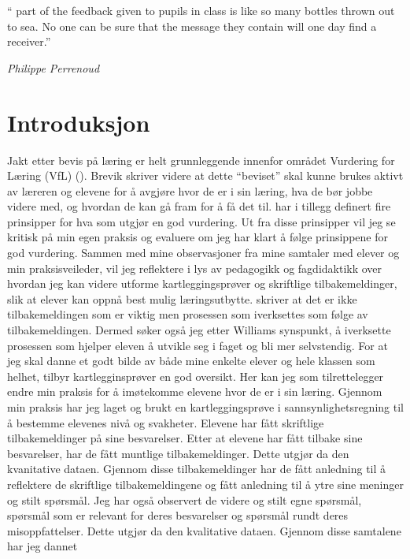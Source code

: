 \documentclass[main.tex]{subfiles}
\begin{document}
\setlength{\epigraphwidth}{0.8\textwidth}
\epigraph{``\textelp{} part of the feedback given to pupils in class is like so many 
bottles thrown out to sea. No one can be sure that the message they contain will one day 
find a receiver.''}
{\textit{Philippe Perrenoud}}

\section*{Introduksjon}
Jakt etter bevis på læring er helt grunnleggende innenfor området Vurdering for Læring (VfL)
(). Brevik skriver videre at dette ``beviset'' skal kunne brukes aktivt
av læreren og elevene for å avgjøre hvor de er i sin læring, hva de bør jobbe videre med, og
hvordan de kan gå fram for å få det til.  har i tillegg definert fire
prinsipper for hva som utgjør en god vurdering. Ut fra disse prinsipper vil jeg se kritisk på min
egen praksis og evaluere om jeg har klart å følge prinsippene for god vurdering. Sammen med
mine observasjoner fra mine samtaler med elever og min praksisveileder, vil jeg reflektere i lys
av pedagogikk og fagdidaktikk over hvordan jeg kan videre utforme kartleggingsprøver og skriftlige 
tilbakemeldinger, slik at elever kan oppnå best mulig læringsutbytte.  skriver at det er ikke 
tilbakemeldingen som er viktig men prosessen som iverksettes som følge av tilbakemeldingen. Dermed søker
også jeg etter Williams synspunkt, å iverksette prosessen som hjelper eleven å utvikle seg i faget 
og bli mer selvstendig. For at jeg skal danne et godt bilde av både mine enkelte elever og hele klassen som
helhet, tilbyr kartlegginsprøver en god oversikt. Her kan jeg som tilrettelegger endre min praksis for å
imøtekomme elevene hvor de er i sin læring.
\newline
\newline
Gjennom min praksis har jeg laget og brukt en kartleggingsprøve i sannsynlighetsregning til å bestemme
elevenes nivå og svakheter. Elevene har fått skriftlige tilbakemeldinger på sine besvarelser.
Etter at elevene har fått tilbake sine besvarelser, har de fått muntlige tilbakemeldinger. Dette utgjør da 
den kvanitative dataen. Gjennom disse tilbakemeldinger har de fått anledning til å reflektere
de skriftlige tilbakemeldingene og fått anledning til å ytre sine meninger og stilt spørsmål. Jeg har også
observert de videre og stilt egne spørsmål, spørsmål som er relevant for deres besvarelser og spørsmål
rundt deres misoppfattelser. Dette utgjør da den kvalitative dataen. Gjennom disse samtalene har jeg dannet 
\end{document}
